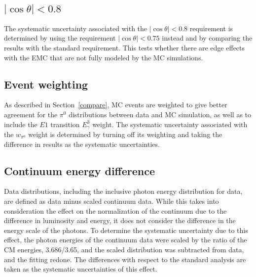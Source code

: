 \documentclass[aps,prd,twocolumn,showpacs,floatfix,byrevtex]{revtex4-1}
\begin{document}

\subsection{\boldmath $|\cos \theta| < 0.8$}
The systematic uncertainty associated with the $|\cos \theta| < 0.8$
requirement is determined by using the requirement $|\cos \theta| <
0.75$ instead and by comparing the results with the standard
requirement.  This tests whether there are edge effects with the EMC
that are not fully modeled by the MC simulations.


\subsection{Event weighting}
As described in Section~\ref{compare}, MC events are weighted to give
better agreement for the $\pi^0$ distributions between data and MC
simulation, as well as to include the $E1$ transition $E_{\gamma}^3$
weight.  The systematic uncertainty associated with the $w_{\pi^0}$
weight is determined by turning off its weighting and taking the
difference in results as the systematic uncertainties.


\subsection{Continuum energy difference}
\label{conenedif}
Data distributions, including the inclusive photon energy distribution
for data, are defined as data minus scaled continuum data.  While this
takes into consideration the effect on the normalization of the
continuum due to the difference in luminosity and energy, it does not
consider the difference in the energy scale of the photons.  To
determine the systematic uncertainty due to this effect, the photon
energies of the continuum data were scaled by the ratio of the CM
energies, 3.686/3.65, and the scaled distribution was subtracted from
data, and the fitting redone. The differences with respect to the
standard analysis are taken as the systematic uncertainties of this
effect.
\end{document}
